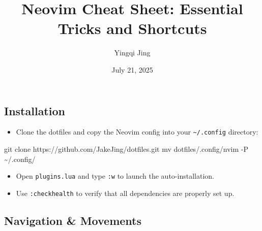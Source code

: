 \documentclass[
  letterpaper,
  DIV=11,
  numbers=noendperiod]{scrartcl}
\title{Neovim Cheat Sheet: Essential Tricks and Shortcuts}
\author{Yingqi Jing}
\date{July 21, 2025}
\newenvironment{Shaded}{}{}
\newcommand{\AttributeTok}[1]{\textcolor[rgb]{0.65,0.15,0.64}{#1}}
\newcommand{\FunctionTok}[1]{\textcolor[rgb]{0.25,0.47,0.95}{#1}}
\newcommand{\NormalTok}[1]{\textcolor[rgb]{0.22,0.23,0.26}{#1}}
\providecommand{\tightlist}{%
  \setlength{\itemsep}{0pt}\setlength{\parskip}{0pt}}\usepackage{longtable,booktabs,array}
\renewcommand*\contentsname{Table of contents}
\newcommand\contentsname{Table of contents}
\begin{document}
\maketitle

\renewcommand*\contentsname{Contents}
{
\hypersetup{linkcolor=}
\setcounter{tocdepth}{4}
\tableofcontents
}
\listoffigures
\listoftables

\clearpage

\subsection{Installation}\label{installation}

\begin{itemize}
\tightlist
\item
  Clone the dotfiles and copy the Neovim config into your
  \texttt{\textasciitilde{}/.config} directory:
\end{itemize}

\begin{Shaded}
\begin{Highlighting}[]
\FunctionTok{git}\NormalTok{ clone https://github.com/JakeJing/dotfiles.git}
\FunctionTok{mv}\NormalTok{ dotfiles/.config/nvim }\AttributeTok{{-}P}\NormalTok{ \textasciitilde{}/.config/}
\end{Highlighting}
\end{Shaded}

\begin{itemize}
\tightlist
\item
  Open \texttt{plugins.lua} and type \texttt{:w} to launch the
  auto-installation.
\item
  Use \texttt{:checkhealth} to verify that all dependencies are properly
  set up.
\end{itemize}

\subsection{Navigation \& Movements}\label{navigation-movements}
\end{document}
